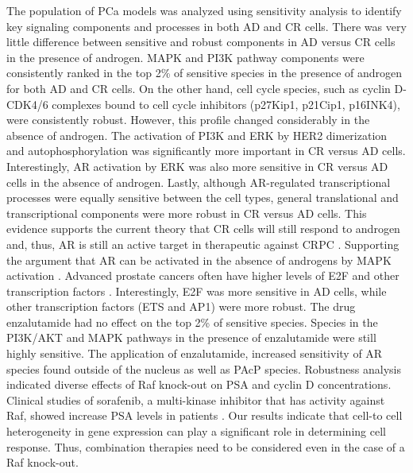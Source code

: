 \documentclass[12pt]{article}
\begin{document}
The population of PCa models was analyzed using sensitivity analysis to identify key signaling components and processes in both AD and CR cells. 
There was very little difference between sensitive and robust components in AD versus CR cells in the presence of androgen. 
MAPK and PI3K pathway components were consistently ranked in the top 2\% of sensitive species in the presence of androgen for both AD and CR cells.
On the other hand, cell cycle species, such as cyclin D-CDK4/6 complexes bound to cell cycle inhibitors (p27Kip1, p21Cip1, p16INK4), were consistently robust. However, this profile changed considerably in the absence of androgen.
The activation of PI3K and ERK by HER2 dimerization and autophosphorylation was significantly more important in CR versus AD cells.
Interestingly, AR activation by ERK was also more sensitive in CR versus AD cells in the absence of androgen.
Lastly, although AR-regulated transcriptional processes were equally sensitive between the cell types, general translational and transcriptional components were more robust in CR versus AD cells.
This evidence supports the current theory that CR cells will still respond to androgen and, thus, AR is still an active target in therapeutic against CRPC \cite{Karantanos2013}. 
Supporting the argument that AR can be activated in the absence of androgens by MAPK activation \cite{Feldman2001}. 
Advanced prostate cancers often have higher levels of E2F and other transcription factors \cite{Davis2006}.
Interestingly, E2F was more sensitive in AD cells, while other transcription factors (ETS and AP1) were more robust. 
The drug enzalutamide had no effect on the top 2\% of sensitive species. 
Species in the PI3K/AKT and MAPK pathways in the presence of enzalutamide were still highly sensitive. 
The application of enzalutamide, increased sensitivity of AR species found outside of the nucleus as well as PAcP species.
Robustness analysis indicated diverse effects of Raf knock-out on PSA and cyclin D concentrations. 
Clinical studies of sorafenib, a multi-kinase inhibitor that has activity against Raf, showed increase PSA levels in patients \cite{Dahut2008}. 
Our results indicate that cell-to cell heterogeneity in gene expression can play a significant role in determining cell response. 
Thus, combination therapies need to be considered even in the case of a Raf knock-out. 
\end{document}
